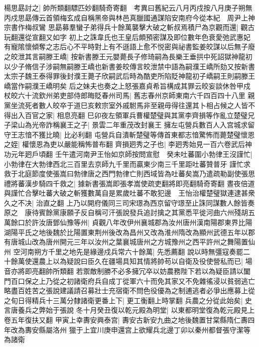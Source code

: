 楊思勗討之|{
	帥所類翻驃匹妙翻騎奇寄翻　考異曰舊紀云八月丙戍按八月庚子朔無丙戍思勗傳云首領梅玄成自稱黑帝與林邑真臘國通謀陷安南府今從本紀　周尹上神宗書作梅叔鸞}
思勗募羣蠻子弟得兵十餘萬襲擊大破之斬叔焉積尸為京觀而還|{
	觀古玩翻還從宣翻又如字}
初上之誅韋氏也王皇后頗預密謀及即位數年色衰愛弛武惠妃有寵隂懷傾奪之志后心不平時對上有不遜語上愈不悦密與祕書監姜皎謀以后無子廢之皎泄其言嗣滕王嶠|{
	按新書滕王元嬰薨長子修琦嗣為長樂王垂拱中死詔獄神龍初以少子脩信子涉嗣無嗣滕王嶠也新書姜皎傳言皎泄禁中語為嗣濮王嶠所劾又按新書太宗子魏王泰得罪後封濮王薨子欣嗣武后時為酷吏所陷貶神龍初子嶠嗣王則嗣滕王嶠當作嗣濮王嶠明矣}
后之妹夫也奏之上怒張嘉貞希旨構成其罪云皎妄談休咎甲戍杖皎六十流欽州弟吏部侍郎晦貶春州司馬|{
	舊志春州京師東南六千四百四十八里}
親黨坐流死者數人皎卒于道巳亥敕宗室外戚駙馬非至親毋得往還其卜相占候之人皆不得出入百官之家|{
	相息亮翻}
巳卯夜左領軍兵曹權楚璧與其黨李齊損等作亂立楚璧兄子梁山為光帝詐稱襄王之子|{
	景雲二年重茂改封襄王}
擁左屯營兵數百人入宫城求留守王志愔不獲比曉|{
	比必利翻}
屯營兵自潰斬楚璧等傳首東都志愔驚怖而薨楚璧懷恩之姪|{
	權懷恩為吏以嚴能稱怖普布翻}
齊損㢠秀之子也|{
	李㢠秀始見一百六卷武后神功元年㢠戶頃翻}
壬午遣河南尹王怡如京師按問宣慰　癸未吐蕃圍小勃律王沒謹忙|{
	小勃律在大勃律西北三百里去京師九千里而贏東少南三千里距吐蕃贊普牙}
謹忙求救于北庭節度使張嵩曰勃律唐之西門勃律亡則西域皆為吐蕃矣嵩乃遣疏勒副使張思禮將蕃漢步騎四千救之|{
	據新書張嵩即張孝嵩使疏吏翻將即亮翻騎奇寄翻}
晝夜倍道與謹忙合擊吐蕃大破之斬獲數萬自是累歲吐蕃不敢犯邊　王怡治權楚璧獄連逮甚衆久之不决|{
	治直之翻}
上乃以開府儀同三司宋璟為西京留守璟至止誅同謀數人餘皆奏原之　康待賓餘黨康願子反自稱可汗張說發兵追討擒之其黨悉平徙河曲六州殘胡五萬餘口於許汝唐鄧仙豫等州|{
	貞觀八年改伊州襄城郡為汝州唐州漢南陽郡東界比陽湖陽平氏之地後魏於比陽置東荆州後改為昌州又改為淮州隋改為顯州武德五年以郡有唐城山改為唐州開元三年以汝州之葉襄城唐州之方城豫州之西平許州之舞陽置仙州}
空河南朔方千里之地先是緣邊戍兵常六十餘萬|{
	先悉薦翻}
說以時無彊寇奏罷二十餘萬使還農上以為疑說曰臣久在疆場具知其情將帥苟以自衛及役使營私而已|{
	場音亦將即亮翻帥所類翻}
若禦敵制勝不必多擁冗卒以妨農務陛下若以為疑臣請以闔門百口保之上乃從之初諸衛府兵自成丁從軍六十而免其家又不免雜徭浸以貧弱逃亡略盡百姓苦之張說建議請召募壯士充宿衛不問色役優為之制逋逃者必爭出應募上從之旬日得精兵十三萬分隸諸衛更番上下|{
	更工衡翻上時掌翻}
兵農之分從此始矣|{
	史言唐養兵之弊始于張說}
冬十月癸丑復以乾元殿為明堂|{
	以東都明堂復為乾元殿見上卷五年復扶又翻}
甲寅上幸夀安興泰宫|{
	夀安古新安九曲之地後魏置甘棠縣隋仁夀四年改為夀安縣屬洛州}
獵于上宜川庚申還宫上欲耀兵北邊丁卯以秦州都督張守潔等為諸衛

